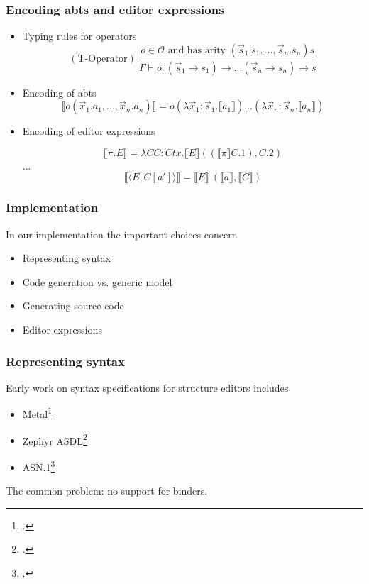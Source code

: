 \documentclass[t,24pt,aspectratio=169]{beamer}
\newcommand{\enc}[1]{\llbracket #1 \rrbracket}
\newcommand{\conf}[2]{\langle #1,#2 \rangle}
\begin{document}
\begin{frame}[hvid]
    \frametitle{Encoding abts and editor expressions}
    \begin{itemize}
        \item Typing rules for operators
              \[
                  (\text{T-Operator}) \ \frac{o \in \mathcal{O} \text{ and has arity } (\Vec{s}_1.s_1,...,\Vec{s}_n.s_n)s}{\Gamma \vdash o : (\Vec{s}_1 \rightarrow s_1) \rightarrow ... (\Vec{s}_n \rightarrow s_n) \rightarrow s}
              \]
        \item Encoding of abts
              \[
                  \llbracket o(\Vec{x}_1.a_1,...,\Vec{x}_n.a_n) \rrbracket = o(\lambda \Vec{x}_1:\Vec{s}_1.\llbracket a_1 \rrbracket)...(\lambda \Vec{x}_n : \Vec{s}_n.\llbracket a_n \rrbracket)
              \]
        \item Encoding of editor expressions
              \begin{center}
                  \[
                      \llbracket \pi.E \rrbracket = \lambda CC : Ctx.\llbracket E \rrbracket ((\llbracket \pi \rrbracket C.1), C.2)
                  \]
                  ...
                  \[
                      \enc{\conf{E}{C[a']}} = \enc{E} \ (\enc{a}, \enc{C})
                  \]
              \end{center}
    \end{itemize}
\end{frame}




\begin{frame}[hvid]
  \frametitle{Implementation}

  In our implementation the important choices concern
  
    \begin{itemize}
        \item Representing syntax
        \item Code generation vs. generic model
        \item Generating source code
        \item Editor expressions
    \end{itemize}
\end{frame}


\begin{frame}
  \frametitle{Representing syntax}

  Early work on syntax specifications for structure editors includes
  
    \begin{itemize}
        \item Metal\footcite{metal}
              \pause
        \item Zephyr ASDL\footcite{zephyr}
              \pause
        \item ASN.1\footcite{asn1}
              \pause
            \end{itemize}

            The common problem: no support for binders.

\end{frame}
\end{document}
